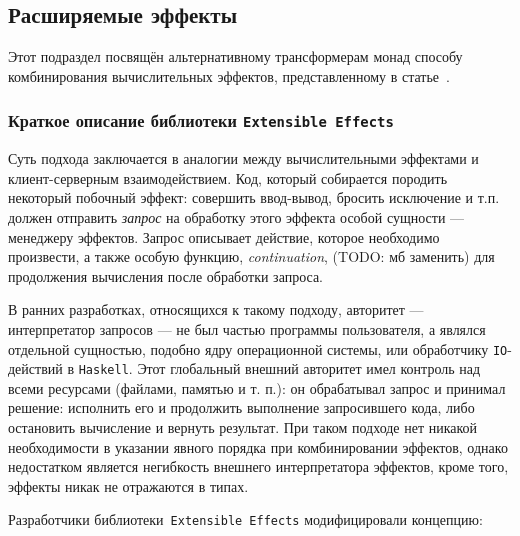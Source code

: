 \subsection{Расширяемые эффекты}

Этот подраздел посвящён альтернативному трансформерам монад способу комбинирования вычислительных эффектов, представленному в статье~\autocite{ExtEffects}.

\subsubsection{Краткое описание библиотеки \lstinline{Extensible Effects}}

Суть подхода заключается в аналогии между вычислительными эффектами и клиент-серверным взаимодействием. Код, который собирается породить некоторый побочный эффект: совершить ввод-вывод, бросить исключение и т.п. должен отправить \emph{запрос} на обработку этого эффекта особой сущности --- менеджеру эффектов. Запрос описывает действие, которое необходимо произвести, а также особую функцию, \emph{continuation}, (TODO: мб заменить) для продолжения вычисления после обработки запроса.

В ранних разработках, относящихся к такому подходу, авторитет --- интерпретатор запросов --- не был частью программы пользователя, а являлся отдельной сущностью, подобно ядру операционной системы, или обработчику \lstinline{IO}-действий в \lstinline{Haskell}. Этот глобальный внешний авторитет имел контроль над всеми ресурсами (файлами, памятью и т. п.): он обрабатывал запрос и принимал решение: исполнить его и продолжить выполнение запросившего кода, либо остановить вычисление и вернуть результат. При таком подходе нет никакой необходимости в указании явного порядка при комбинировании эффектов, однако недостатком является негибкость внешнего интерпретатора эффектов, кроме того, эффекты никак не отражаются в типах.

Разработчики библиотеки~\lstinline{Extensible Effects} модифицировали концепцию:

